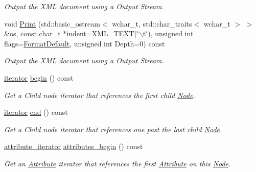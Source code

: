 \begin{DoxyCompactItemize}
\begin{DoxyCompactList}\small\item\em Output the XML document using a Output Stream. \item\end{DoxyCompactList}\item 
void \hyperlink{classphys_1_1xml_1_1Node_ac705b62114dbc65a204ed2197891322c}{Print} (std::basic\_\-ostream$<$ wchar\_\-t, std::char\_\-traits$<$ wchar\_\-t $>$ $>$ \&os, const char\_\-t $\ast$indent=XML\_\-TEXT(\char`\"{}$\backslash$t\char`\"{}), unsigned int flags=\hyperlink{namespacephys_1_1xml_a08bf6aab51f79929d9097706a5e64408}{FormatDefault}, unsigned int Depth=0) const 
\begin{DoxyCompactList}\small\item\em Output the XML document using a Output Stream. \item\end{DoxyCompactList}\item 
\hyperlink{classphys_1_1xml_1_1NodeIterator}{iterator} \hyperlink{classphys_1_1xml_1_1Node_a39a71c0c078f648de0e716ed59a0446a}{begin} () const 
\begin{DoxyCompactList}\small\item\em Get a Child node iterator that references the first child \hyperlink{classphys_1_1xml_1_1Node}{Node}. \item\end{DoxyCompactList}\item 
\hyperlink{classphys_1_1xml_1_1NodeIterator}{iterator} \hyperlink{classphys_1_1xml_1_1Node_a1f083209c52d7af4a354db2b3f198cf8}{end} () const 
\begin{DoxyCompactList}\small\item\em Get a Child node iterator that references one past the last child \hyperlink{classphys_1_1xml_1_1Node}{Node}. \item\end{DoxyCompactList}\item 
\hyperlink{classphys_1_1xml_1_1AttributeIterator}{attribute\_\-iterator} \hyperlink{classphys_1_1xml_1_1Node_a9ede8da51d334d31167a6740e233c103}{attributes\_\-begin} () const 
\begin{DoxyCompactList}\small\item\em Get an \hyperlink{classphys_1_1xml_1_1Attribute}{Attribute} iterator that references the first \hyperlink{classphys_1_1xml_1_1Attribute}{Attribute} on this \hyperlink{classphys_1_1xml_1_1Node}{Node}. \item\end{DoxyCompactList}\item 

\end{DoxyCompactItemize}
